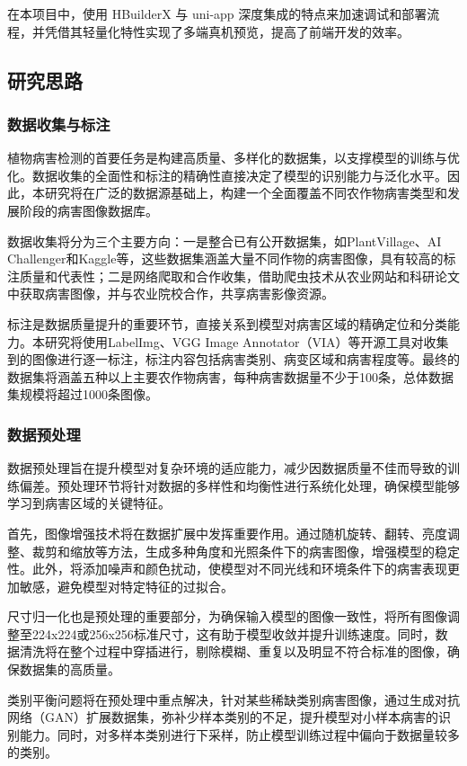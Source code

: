 在本项目中，使用 HBuilderX 与 uni-app 深度集成的特点来加速调试和部署流程，并凭借其轻量化特性实现了多端真机预览，提高了前端开发的效率。

\subsection{研究思路}
\subsubsection{数据收集与标注}
植物病害检测的首要任务是构建高质量、多样化的数据集，以支撑模型的训练与优化。数据收集的全面性和标注的精确性直接决定了模型的识别能力与泛化水平。因此，本研究将在广泛的数据源基础上，构建一个全面覆盖不同农作物病害类型和发展阶段的病害图像数据库。

数据收集将分为三个主要方向：一是整合已有公开数据集，如PlantVillage、AI Challenger和Kaggle等，这些数据集涵盖大量不同作物的病害图像，具有较高的标注质量和代表性；二是网络爬取和合作收集，借助爬虫技术从农业网站和科研论文中获取病害图像，并与农业院校合作，共享病害影像资源。

标注是数据质量提升的重要环节，直接关系到模型对病害区域的精确定位和分类能力。本研究将使用LabelImg、VGG Image Annotator（VIA）等开源工具对收集到的图像进行逐一标注，标注内容包括病害类别、病变区域和病害程度等。最终的数据集将涵盖五种以上主要农作物病害，每种病害数据量不少于100条，总体数据集规模将超过1000条图像。

\subsubsection{数据预处理}
数据预处理旨在提升模型对复杂环境的适应能力，减少因数据质量不佳而导致的训练偏差。预处理环节将针对数据的多样性和均衡性进行系统化处理，确保模型能够学习到病害区域的关键特征。

首先，图像增强技术将在数据扩展中发挥重要作用。通过随机旋转、翻转、亮度调整、裁剪和缩放等方法，生成多种角度和光照条件下的病害图像，增强模型的稳定性。此外，将添加噪声和颜色扰动，使模型对不同光线和环境条件下的病害表现更加敏感，避免模型对特定特征的过拟合。

尺寸归一化也是预处理的重要部分，为确保输入模型的图像一致性，将所有图像调整至224x224或256x256标准尺寸，这有助于模型收敛并提升训练速度。同时，数据清洗将在整个过程中穿插进行，剔除模糊、重复以及明显不符合标准的图像，确保数据集的高质量。

类别平衡问题将在预处理中重点解决，针对某些稀缺类别病害图像，通过生成对抗网络（GAN）扩展数据集，弥补少样本类别的不足，提升模型对小样本病害的识别能力。同时，对多样本类别进行下采样，防止模型训练过程中偏向于数据量较多的类别。

